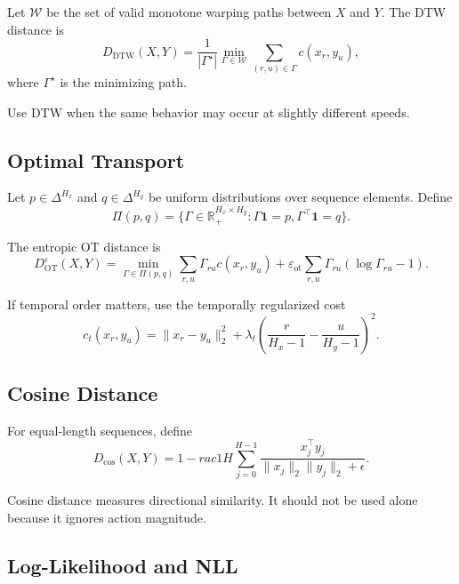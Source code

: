 \documentclass[11pt]{article}
\begin{document}
Let $\mathcal{W}$ be the set of valid monotone warping paths between $X$ and $Y$. The DTW distance is
\begin{equation}
D_{\mathrm{DTW}}(X,Y)
=
\frac{1}{|\Gamma^{\star}|}
\min_{\Gamma\in\mathcal{W}}
\sum_{(r,u)\in\Gamma} c(x_r,y_u),
\end{equation}
where $\Gamma^{\star}$ is the minimizing path.

Use DTW when the same behavior may occur at slightly different speeds.

\subsection{Optimal Transport}

Let $p\in\Delta^{H_x}$ and $q\in\Delta^{H_y}$ be uniform distributions over sequence elements. Define
\begin{equation}
\Pi(p,q)=\{\Gamma\in\mathbb{R}_{+}^{H_x\times H_y}:\Gamma\mathbf{1}=p,\Gamma^{\top}\mathbf{1}=q\}.
\end{equation}

The entropic OT distance is
\begin{equation}
D^{\varepsilon}_{\mathrm{OT}}(X,Y)
=
\min_{\Gamma\in\Pi(p,q)}
\sum_{r,u}\Gamma_{ru}c(x_r,y_u)
+
\varepsilon_{\mathrm{ot}}
\sum_{r,u}\Gamma_{ru}(\log\Gamma_{ru}-1).
\end{equation}

If temporal order matters, use the temporally regularized cost
\begin{equation}
c_t(x_r,y_u)
=
\|x_r-y_u\|_2^2
+
\lambda_t\left(\frac{r}{H_x-1}-\frac{u}{H_y-1}\right)^2.
\end{equation}

\subsection{Cosine Distance}

For equal-length sequences, define
\begin{equation}
D_{\mathrm{cos}}(X,Y)
=
1-rac{1}{H}
\sum_{j=0}^{H-1}
\frac{x_j^{\top}y_j}{\|x_j\|_2\|y_j\|_2+\epsilon}.
\end{equation}

Cosine distance measures directional similarity. It should not be used alone because it ignores action magnitude.

\subsection{Log-Likelihood and NLL}
\end{document}
